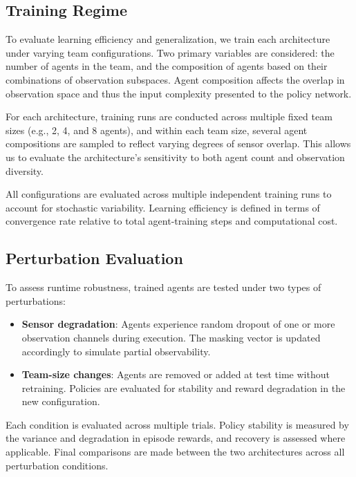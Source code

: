 \documentclass{article}
\begin{document}

\subsection{Training Regime}

To evaluate learning efficiency and generalization, 
we train each architecture under varying team configurations. 
Two primary variables are considered: the number of agents in the team, 
and the composition of agents based on their combinations of observation subspaces. 
Agent composition affects the overlap in observation space and thus 
the input complexity presented to the policy network. 

For each architecture, training runs are conducted across multiple 
fixed team sizes (e.g., 2, 4, and 8 agents), and within each team size, 
several agent compositions are sampled to reflect varying degrees of sensor overlap. 
This allows us to evaluate the architecture's sensitivity to 
both agent count and observation diversity.

All configurations are evaluated across multiple independent 
training runs to account for stochastic variability.
Learning efficiency is defined in terms of convergence rate 
relative to total agent-training steps and computational cost.

\subsection{Perturbation Evaluation}

To assess runtime robustness, trained agents are tested under two types of perturbations:

\begin{itemize}
    \item \textbf{Sensor degradation}: Agents experience random dropout 
        of one or more observation channels during execution. 
        The masking vector is updated accordingly to simulate partial observability.
    \item \textbf{Team-size changes}: Agents are removed or added at test 
        time without retraining. Policies are evaluated for stability and 
        reward degradation in the new configuration.
\end{itemize}

Each condition is evaluated across multiple trials. 
Policy stability is measured by the variance and degradation in episode rewards, 
and recovery is assessed where applicable. 
Final comparisons are made between the two architectures across all perturbation conditions.



\printbibliography
\end{document}
